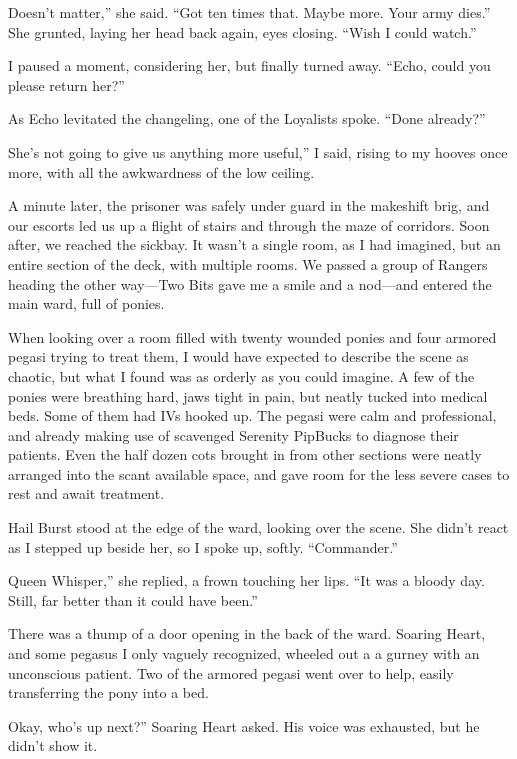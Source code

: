 \leavevmode{}Doesn’t matter,” she said. “Got ten times that. Maybe more. Your army dies.” She grunted, laying her head back again, eyes closing. “Wish I could watch.”

I paused a moment, considering her, but finally turned away. “Echo, could you please return her?”

As Echo levitated the changeling, one of the Loyalists spoke. “Done already?”

\leavevmode{}She’s not going to give us anything more useful,” I said, rising to my hooves once more, with all the awkwardness of the low ceiling.

A minute later, the prisoner was safely under guard in the makeshift brig, and our escorts led us up a flight of stairs and through the maze of corridors. Soon after, we reached the sickbay. It wasn’t a single room, as I had imagined, but an entire section of the deck, with multiple rooms. We passed a group of Rangers heading the other way—Two Bits gave me a smile and a nod—and entered the main ward, full of ponies.

When looking over a room filled with twenty wounded ponies and four armored pegasi trying to treat them, I would have expected to describe the scene as chaotic, but what I found was as orderly as you could imagine. A few of the ponies were breathing hard, jaws tight in pain, but neatly tucked into medical beds. Some of them had IVs hooked up. The pegasi were calm and professional, and already making use of scavenged Serenity PipBucks to diagnose their patients. Even the half dozen cots brought in from other sections were neatly arranged into the scant available space, and gave room for the less severe cases to rest and await treatment.

Hail Burst stood at the edge of the ward, looking over the scene. She didn’t react as I stepped up beside her, so I spoke up, softly. “Commander.”

\leavevmode{}Queen Whisper,” she replied, a frown touching her lips. “It was a bloody day. Still, far better than it could have been.”

There was a thump of a door opening in the back of the ward. Soaring Heart, and some pegasus I only vaguely recognized, wheeled out a a gurney with an unconscious patient. Two of the armored pegasi went over to help, easily transferring the pony into a bed.

\leavevmode{}Okay, who’s up next?” Soaring Heart asked. His voice was exhausted, but he didn’t show it.

